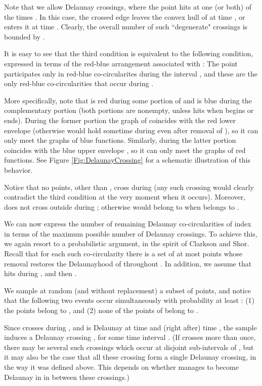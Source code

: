 \documentclass[letter,11pt]{article}
\begin{document}
Note that we allow Delaunay crossings, where the point  hits  at one (or both) of the times . In this case, the crossed edge  leaves the convex hull of  at time , or enters it at time . Clearly, the overall number of such ``degenerate" crossings is bounded by .

It is easy to see that the third condition is equivalent to the following condition, expressed in terms of the red-blue arrangement  associated with : The point  participates only in red-blue co-circularites during the interval , and these are the only red-blue co-circularities that occur during .

More specifically, note that  is red during some portion of  and is blue during the complementary portion (both portions are nonempty, unless  hits  when  begins or ends). During the former portion the graph of  coincides with the red lower envelope  (otherwise  would hold sometime during  even after removal of ), so it can only meet the graphs of blue functions. Similarly, during the latter portion  coincides with the blue upper envelope , so it can only meet the graphs of red functions.
See Figure \ref{Fig:DelaunayCrossing} for a schematic illustration of this behavior.

Notice that no points, other than , cross  during  (any such crossing would clearly contradict the third condition at the very moment when it occurs).
Moreover,  does not cross  outside  during ; otherwise  would belong to  when  belongs to .






\medskip
{} We can now express the number of remaining Delaunay co-circularities of index  in terms of the maximum possible number of Delaunay crossings. To achieve this, we again resort to a probabilistic argument, in the spirit of Clarkson and Shor. Recall that for each such co-circularity there is a set  of at most  points whose removal restores the Delaunayhood of  throughout . In addition, we assume that  hits  during , and then .

We sample at random (and without replacement) a subset  of  points, and notice that the following two events occur simultaneously with probability at least : (1) the points  belong to , and (2) none of the points of  belong to . 

Since  crosses  during , and  is Delaunay at time  and (right after) time , the sample  induces a Delaunay crossing , for some time interval . (If  crosses  more than once, there may be several such crossings which occur at disjoint  sub-intervals of , but it may also be the case that all these crossing form a single Delaunay crossing, in the way it was defined above. This depends on whether  manages to become Delaunay in  in between these crossings.)
\end{document}
